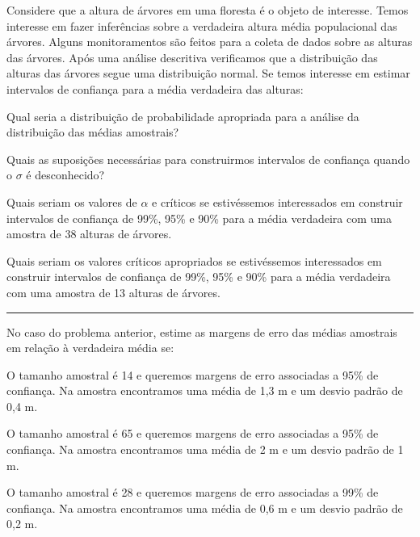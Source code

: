 \documentclass[a4paper,11pt,fleqn]{article}\usepackage[]{graphicx}\usepackage[]{color}
\theoremstyle{definition}
\begin{document}
\begin{compactenum}[8.]
\item Considere que a altura de árvores em uma floresta é o
  objeto de interesse. Temos interesse em fazer inferências sobre a
  verdadeira altura média populacional das árvores. Alguns monitoramentos
  são feitos para a coleta de dados sobre as alturas das árvores. Após uma
  análise descritiva verificamos que a distribuição das alturas das
  árvores segue uma distribuição normal. Se temos interesse em estimar
  intervalos de confiança para a média verdadeira das alturas:
  \begin{compactenum}
  \item Qual seria a distribuição de probabilidade apropriada para a
    análise da distribuição das médias amostrais?
  \item Quais as suposições necessárias para construirmos intervalos de
    confiança quando o $\sigma$ é desconhecido?
  \item Quais seriam os valores de $\alpha$ e críticos se estivéssemos
    interessados em construir intervalos de confiança de 99\%, 95\% e 90\%
    para a média verdadeira com uma amostra de 38 alturas de árvores.
  \item Quais seriam os valores críticos apropriados se estivéssemos
    interessados em construir intervalos de confiança de 99\%, 95\% e 90\%
    para a média verdadeira com uma amostra de 13 alturas de árvores.
  \end{compactenum}
\end{compactenum}

\vspace{0.3cm}
\hrule
\vspace{0.3cm}

\begin{compactenum}[9.]
\item No caso do problema anterior, estime as margens de erro
  das médias amostrais em relação à verdadeira média se:
  \begin{compactenum}
  \item O tamanho amostral é 14 e queremos margens de erro associadas a
    95\% de confiança. Na amostra encontramos uma média de 1,3 m e um
    desvio padrão de 0,4 m.
  \item O tamanho amostral é 65 e queremos margens de erro
    associadas a 95\% de confiança. Na amostra encontramos uma média de
    2 m e um desvio padrão de 1 m.
  \item O tamanho amostral é 28 e queremos margens de erro
    associadas a 99\% de confiança. Na amostra encontramos uma média de
    0,6 m e um desvio padrão de 0,2 m.
  \end{compactenum}
\end{compactenum}
\end{document}

